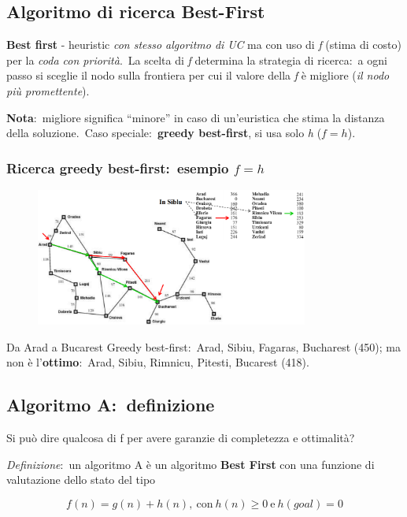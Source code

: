 \subsection{Algoritmo di ricerca Best-First}

\textbf{Best first} - heuristic \textit{con stesso algoritmo di UC} ma con uso di \textit{f} (stima di costo) per la \textit{coda con priorità}.\
La scelta di \textit{f} determina la strategia di ricerca:\ a ogni passo si sceglie il nodo sulla frontiera per cui il valore della \textit{f} è migliore (\textit{il nodo più promettente}).\

\noindent\textbf{Nota}:\ migliore significa ``minore'' in caso di un'euristica che stima la distanza della soluzione.\
Caso speciale:\ \textbf{greedy best-first}, si usa solo \textit{h} ($f=h$).

\subsubsection{Ricerca greedy best-first:\ esempio $f=h$}
\begin{figure}[H]
	\centering
	\includegraphics[width=0.8\textwidth]{immagini/greedy_bestFirst.png}
\end{figure}

Da Arad a Bucarest Greedy best-first:\ Arad, Sibiu, Fagaras, Bucharest (450); ma non è l'\textbf{ottimo}:\ Arad, Sibiu, Rimnicu, Pitesti, Bucarest (418).

\subsection{Algoritmo A:\ definizione}
Si può dire qualcosa di f per avere garanzie di completezza e ottimalità?\

\noindent \textit{Definizione}:\ un algoritmo A è un algoritmo \textbf{Best First} con una funzione di valutazione dello stato del tipo

\[f(n) = g(n) + h(n),\ \mathrm{con}\ h(n) \geq 0\ \mathrm{e}\ h(goal)=0\]

